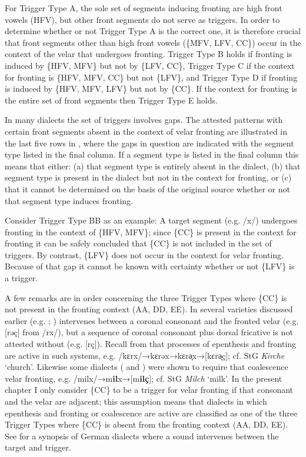 For Trigger Type A, the sole set of segments inducing fronting are high front vowels (HFV), but other front segments do not serve as triggers. In order to determine whether or not Trigger Type A is the correct one, it is therefore crucial that front segments other than high front vowels (\{MFV, LFV, CC\}) occur in the context of the velar that undergoes fronting. Trigger Type B holds if fronting is induced by \{HFV, MFV\} but not by \{LFV, CC\}, Trigger Type C if the context for fronting is \{HFV, MFV, CC\} but not \{LFV\}, and Trigger Type D if fronting is induced by \{HFV, MFV, LFV\} but not by \{CC\}. If the context for fronting is the entire set of front segments then Trigger Type E holds.

In many dialects the set of triggers involves gaps. The attested patterns with certain front segments absent in the context of velar fronting are illustrated in the last five rows in , where the gaps in question are indicated with the segment type listed in the final column. If a segment type is listed in the final column this means that either: (a) that segment type is entirely absent in the dialect, (b) that segment type is present in the dialect but not in the context for fronting, or (c) that it cannot be determined on the basis of the original source whether or not that segment type induces fronting.

Consider Trigger Type BB as an example: A target segment (e.g. /x/) undergoes fronting in the context of \{HFV, MFV\}; since \{CC\} is present in the context for fronting it can be safely concluded that \{CC\} is not included in the set of triggers. By contrast, \{LFV\} does not occur in the context for velar fronting. Because of that gap it cannot be known with certainty whether or not \{LFV\} is a trigger.

A few remarks are in order concerning the three Trigger Types where \{CC\} is not present in the fronting context (AA, DD, EE). In several varieties discussed earlier (e.g. ; )  intervenes between a coronal consonant and the fronted velar (e.g. [rəç] from /rx/), but a sequence of coronal consonant plus dorsal fricative is not attested without  (e.g. [rç]). Recall from  that processes of  epenthesis and  fronting are active in such systems, e.g. /kɛrx/→{\textbar}kɛrǝx{\textbar}→{\textbar}kɛrə̟x{\textbar}→[kɛrə̟ç]; cf. StG \textit{Kirche} ‘church’. Likewise some dialects ( and ) were shown to require that coalescence  velar fronting, e.g. /milx/→{\textbar}m\textbf{il}x{\textbar}→[m\textbf{ilç}]; cf. StG \textit{Milch} ‘milk’. In the present chapter I only consider \{CC\} to be a trigger for velar fronting if that consonant and the velar are adjacent; this assumption means that dialects in which  epenthesis and  fronting or coalescence are active are classified as one of the three Trigger Types where \{CC\} is absent from the fronting context (AA, DD, EE). See  for a synopsis of German dialects where a sound intervenes between the target and trigger.

